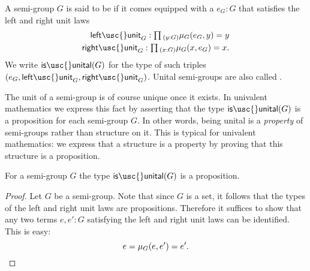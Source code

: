 \begin{defn}
  A semi-group $G$ is said to be  if it comes equipped with a  $e_G:G$ that satisfies the left and right unit laws
  \begin{align*}
    \mathsf{left\usc{}unit}_G : \prd{y:G}\mu_G(e_G,y)=y \\
    \mathsf{right\usc{}unit}_G : \prd{x:G}\mu_G(x,e_G)=x.
  \end{align*}
  We write $\mathsf{is\usc{}unital}(G)$ for the type of such triples $(e_G,\mathsf{left\usc{}unit}_G,\mathsf{right\usc{}unit}_G)$. Unital semi-groups are also called .
\end{defn}

The unit of a semi-group is of course unique once it exists. In univalent mathematics we express this fact by asserting that the type $\mathsf{is\usc{}unital}(G)$ is a proposition for each semi-group $G$. In other words, being unital is a \emph{property} of semi-groups rather than structure on it. This is typical for univalent mathematics: we express that a structure is a property by proving that this structure is a proposition.

\begin{lem}
  For a semi-group $G$ the type $\mathsf{is\usc{}unital}(G)$ is a proposition.
\end{lem}

\begin{proof}
  Let $G$ be a semi-group. Note that since $G$ is a set, it follows that the types of the left and right unit laws are propositions. Therefore it suffices to show that any two terms $e,e':G$ satisfying the left and right unit laws can be identified. This is easy:
  \begin{equation*}
    e = \mu_G(e,e') = e'.\qedhere
  \end{equation*}
\end{proof}

